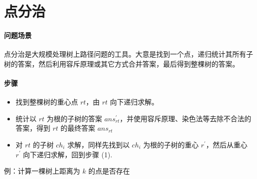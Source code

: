 \section{点分治}
\paragraph{问题场景}
\noindent \par 点分治是大规模处理树上路径问题的工具。大意是找到一个点，递归统计其所有子树的答案，然后利用容斥原理或其它方式合并答案，最后得到整棵树的答案。
\paragraph{步骤}
\begin{itemize}
    \item 找到整棵树的重心点 $rt$，由 $rt$ 向下递归求解。
    \item 统计以 $rt$ 为根的子树的答案 $ans_{rt}^\prime$，并使用容斥原理、染色法等去除不合法的答案，得到 $rt$ 的最终答案 $ans_{rt}$
    \item 对 $rt$ 的子树 $ch_i$ 求解，同样先找到以 $ch_i$ 为根的子树的重心 $r^\prime$，然后从重心 $r^\prime$ 向下递归求解，回到步骤 (1).
\end{itemize}
\par 例：计算一棵树上距离为 $k$ 的点是否存在
